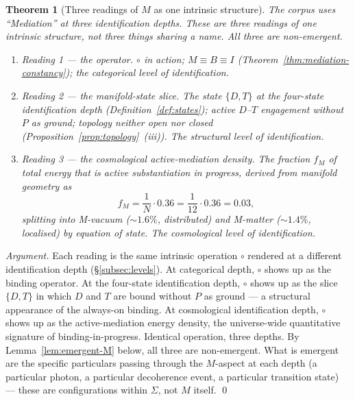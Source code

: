 \documentclass[11pt,a4paper]{article}
\newtheorem{theorem}{Theorem}[section]
\theoremstyle{definition}
\theoremstyle{remark}
\begin{document}
\begin{theorem}[Three readings of $M$ as one intrinsic structure]\label{thm:M-three-readings}
The corpus uses ``Mediation'' at three identification depths. These are three readings of one intrinsic structure, not three things sharing a name. All three are non-emergent.
\begin{enumerate}[label=\textnormal{(\roman*)},leftmargin=*]
\item \emph{Reading 1 --- the operator.} $\circ$ in action; $M \equiv B \equiv I$ (Theorem~\ref{thm:mediation-constancy}); the categorical level of identification.
\item \emph{Reading 2 --- the manifold-state slice.} The state $\{D, T\}$ at the four-state identification depth (Definition~\ref{def:states}); active $D$--$T$ engagement without $P$ as ground; topology neither open nor closed (Proposition~\ref{prop:topology}~(iii)). The structural level of identification.
\item \emph{Reading 3 --- the cosmological active-mediation density.} The fraction $f_{M}$ of total energy that is active substantiation in progress, derived from manifold geometry as
\[
f_{M} = \frac{1}{N}\cdot 0.36 = \frac{1}{12}\cdot 0.36 = 0.03,
\]
splitting into M-vacuum ($\sim 1.6\%$, distributed) and M-matter ($\sim 1.4\%$, localised) by equation of state. The cosmological level of identification.
\end{enumerate}
\end{theorem}

\begin{proof}[Argument]
Each reading is the same intrinsic operation $\circ$ rendered at a different identification depth (\S\ref{subsec:levels}). At categorical depth, $\circ$ shows up as the binding operator. At the four-state identification depth, $\circ$ shows up as the slice $\{D,T\}$ in which $D$ and $T$ are bound without $P$ as ground --- a structural appearance of the always-on binding. At cosmological identification depth, $\circ$ shows up as the active-mediation energy density, the universe-wide quantitative signature of binding-in-progress. Identical operation, three depths. By Lemma~\ref{lem:emergent-M} below, all three are non-emergent. What is emergent are the specific particulars passing through the $M$-aspect at each depth (a particular photon, a particular decoherence event, a particular transition state) --- these are configurations within $\Sigma$, not $M$ itself. \qed
\end{proof}
\end{document}

